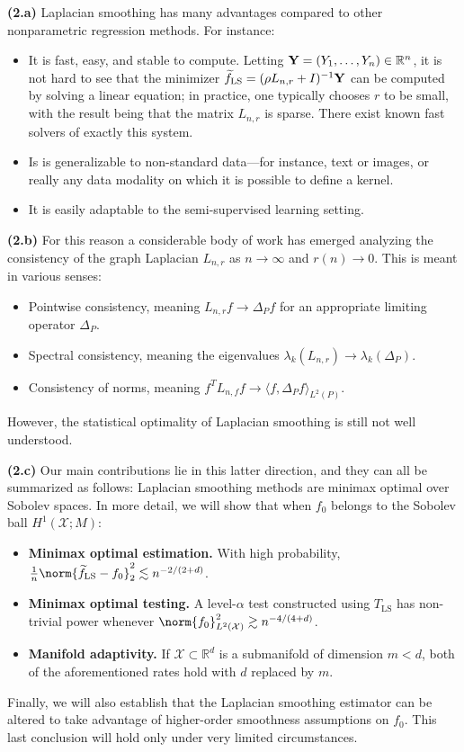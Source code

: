 \documentclass{article}
\newcommand{\Reals}{\mathbb{R}}
\newcommand{\1}{\mathbf{1}}
\newcommand{\Rd}{\Reals^d}
\newcommand{\Lap}{L}
\newcommand{\Xset}{\mathcal{X}}
\newcommand{\Leb}{L}
\newcommand{\mc}[1]{\mathcal{#1}}
\newcommand{\wt}[1]{\widetilde{#1}}
\newcommand{\LS}{\mathrm{LS}}
\theoremstyle{alden}
\theoremstyle{aldenthm}
\theoremstyle{definition}
\theoremstyle{remark}
\begin{document}
\textbf{(2.a)} Laplacian smoothing has many advantages compared to other nonparametric regression methods. For instance:

\begin{itemize}
	\item It is fast, easy, and stable to compute. Letting ${\bf Y} = (Y_1,\ldots,Y_n) \in \Reals^n$, it is not hard to see that the minimizer $\wt{f}_{\LS} = (\rho \Lap_{n,r} + I)^{-1}{\bf Y}$ can be computed by solving a linear equation; in practice, one typically chooses $r$ to be small, with the result being that the matrix $\Lap_{n,r}$ is sparse. There exist known fast solvers of exactly this system.
	\item Is is generalizable to non-standard data---for instance, text or images, or really any data modality on which it is possible to define a kernel.
	\item It is easily adaptable to the semi-supervised learning setting. 
\end{itemize}

\textbf{(2.b)} For this reason a considerable body of work has emerged analyzing the consistency of the graph Laplacian $\Lap_{{n,r}}$ as $n \to \infty$ and $r(n) \to 0$. This is meant in various senses:
\begin{itemize}
	\item Pointwise consistency, meaning $\Lap_{n,r}f \to \Delta_Pf$ for an appropriate limiting operator $\Delta_P$.
	\item Spectral consistency, meaning the eigenvalues $\lambda_k(\Lap_{n,r}) \to \lambda_k(\Delta_P)$.
	\item Consistency of norms, meaning $f^T \Lap_{n,f} f \to \langle f,\Delta_Pf \rangle_{\Leb^2(P)}$. 
\end{itemize}
However, the statistical optimality of Laplacian smoothing is still not well understood.

\textbf{(2.c)} Our main contributions lie in this latter direction, and they can all be summarized as follows: Laplacian smoothing methods are minimax optimal over Sobolev spaces. In more detail, we will show that when $f_0$ belongs to the Sobolev ball $H^1(\Xset;M)$:
\begin{itemize}
	\item \textbf{Minimax optimal estimation.} With high probability, $\frac{1}{n}\norm{\wt{f}_{\LS} - f_0}_{2}^2 \lesssim n^{-2/(2 + d)}$.
	\item \textbf{Minimax optimal testing.}
	A level-$\alpha$ test constructed using $T_{\LS}$ has non-trivial power whenever $\norm{f_0}_{\Leb^2(\Xset)}^2 \gtrsim n^{-4/(4 + d)}$. 
	\item \textbf{Manifold adaptivity.}
	If $\mc{X} \subset \Rd$ is a submanifold of dimension $m < d$, both of the aforementioned rates hold with $d$ replaced by $m$.
\end{itemize}
Finally, we will also establish that the Laplacian smoothing estimator can be altered to take advantage of higher-order smoothness assumptions on $f_0$. This last conclusion will hold only under very limited circumstances.
\end{document}
